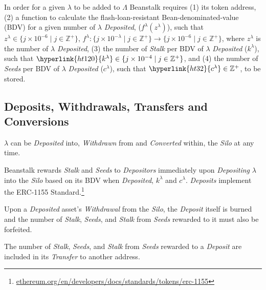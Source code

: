 \documentclass[tikz]{article}
\newcommand{\term}[1]{\textsl{#1}}
\newcommand{\fref}[1]{\footnote{\href{http://#1}{#1}}}
\begin{document}
In order for a given \hyperlink{ht126}{$\lambda$} to be added to \hyperlink{ht127}{$\Lambda$} Beanstalk requires (1) its token address, (2) a function to calculate the flash-loan-resistant Bean-denominated-value (BDV) for a given number of \hyperlink{ht126}{$\lambda$} \term{Deposited}, (\hyperlink{ht84}{$f^{\lambda}(z^{\lambda})$}), such that $z^{\lambda} \in \{j \times 10^{-6} \mid j \in \mathbb{Z}^{+} \}$, $f^{\lambda}\colon \{j \times 10^{-\lambda} \mid j \in \mathbb{Z}^{+} \} \rightarrow \{j \times 10^{-6} \mid j \in \mathbb{Z}^{+} \}$, where $z^{\lambda}$ is the number of \hyperlink{ht126}{$\lambda$} \term{Deposited}, (3) the number of \term{Stalk} per BDV of \hyperlink{ht126}{$\lambda$} \term{Deposited} (\hyperlink{ht120}{$k^{\lambda}$}), such that $\hyperlink{ht120}{k^{\lambda}} \in \{j \times 10^{-4} \mid j \in \mathbb{Z}^{+} \}$, and (4) the number of \term{Seeds} per BDV of \hyperlink{ht126}{$\lambda$} \term{Deposited} (\hyperlink{ht32}{$c^{\lambda}$}), such that $\hyperlink{ht32}{c^{\lambda}} \in \mathbb{Z}^{+}$, to be stored.

\vspace*{-1mm}
\subsection{Deposits, Withdrawals, Transfers and Conversions}
\vspace*{-1mm}
\hyperlink{ht126}{$\lambda$} can be \term{Deposited} into, \term{Withdrawn} from and \term{Converted} within, the \term{Silo} at any time.

\vspace*{-1mm}

Beanstalk rewards \term{Stalk} and \term{Seeds} to \term{Depositors} immediately upon \term{Depositing} \hyperlink{ht126}{$\lambda$} into the \term{Silo} based on its BDV when \term{Deposited}, \hyperlink{ht120}{$k^{\lambda}$} and \hyperlink{ht32}{$c^{\lambda}$}. \term{Deposits} implement the ERC-1155 Standard.\fref{ethereum.org/en/developers/docs/standards/tokens/erc-1155}

Upon a \term{Deposited} asset's \term{Withdrawal} from the \term{Silo}, the \term{Deposit} itself is burned and the number of \term{Stalk}, \term{Seeds}, and \term{Stalk} from \term{Seeds} rewarded to it must also be forfeited. 

The number of \term{Stalk}, \term{Seeds}, and \term{Stalk} from \term{Seeds} rewarded to a \term{Deposit} are included in its \term{Transfer} to another address.
\end{document}
